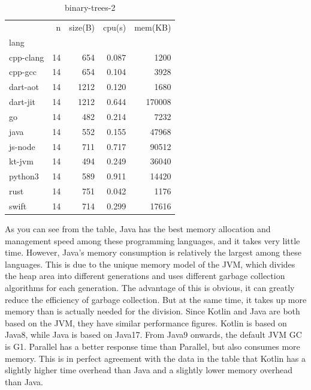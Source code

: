 \begin{table}[ht]
    \caption{binary-trees-2}
    \label{tab:binary-trees-2}
    \begin{center}
        \begin{tabular}{lrrrr}
            \toprule
            {}        & n  & size(B) & cpu(s) & mem(KB) \\
            lang      &    &         &        &         \\
            \midrule
            cpp-clang & 14 & 654     & 0.087  & 1200    \\
            cpp-gcc   & 14 & 654     & 0.104  & 3928    \\
            dart-aot  & 14 & 1212    & 0.120  & 1680    \\
            dart-jit  & 14 & 1212    & 0.644  & 170008  \\
            go        & 14 & 482     & 0.214  & 7232    \\
            java      & 14 & 552     & 0.155  & 47968   \\
            js-node   & 14 & 711     & 0.717  & 90512   \\
            kt-jvm    & 14 & 494     & 0.249  & 36040   \\
            python3   & 14 & 589     & 0.911  & 14420   \\
            rust      & 14 & 751     & 0.042  & 1176    \\
            swift     & 14 & 714     & 0.299  & 17616   \\
            \bottomrule
        \end{tabular}
    \end{center}
\end{table}

As you can see from the table, Java has the best memory allocation and management speed among these programming languages, and it takes very little time. However, Java's memory consumption is relatively the largest among these languages. This is due to the unique memory model of the JVM, which divides the heap area into different generations and uses different garbage collection algorithms for each generation. The advantage of this is obvious, it can greatly reduce the efficiency of garbage collection. But at the same time, it takes up more memory than is actually needed for the division. Since Kotlin and Java are both based on the JVM, they have similar performance figures. Kotlin is based on Java8, while Java is based on Java17. From Java9 onwards, the default JVM GC is G1. Parallel has a better response time than Parallel, but also consumes more memory. This is in perfect agreement with the data in the table that Kotlin has a slightly higher time overhead than Java and a slightly lower memory overhead than Java.

